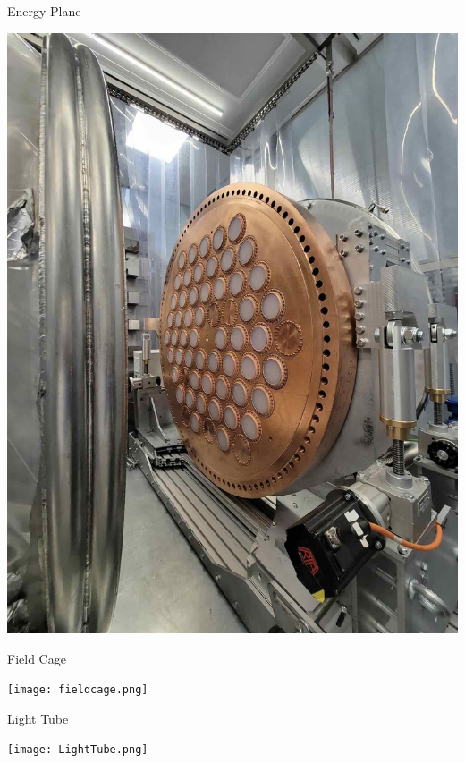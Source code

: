 \documentclass [aspectratio=169]{beamer}
\begin{document}
\begin{frame}{Energy Plane}

\includegraphics[scale=0.23]{n100-pmt.jpeg}

\end{frame}



\begin{frame}{Field Cage}

\texttt{[image: fieldcage.png]}

\end{frame}


\begin{frame}{Light Tube}

\texttt{[image: LightTube.png]}

\end{frame}

%
%
%
%
%
\end{document}
